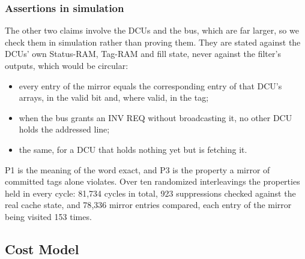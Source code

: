 \documentclass[conference]{IEEEtran}
\begin{document}
\subsubsection{Assertions in simulation}
The other two claims involve the DCUs and the bus, which are far larger, so we
check them in simulation rather than proving them. They are stated against the
DCUs' own Status-RAM, Tag-RAM and fill state, never against the filter's
outputs, which would be circular:
\begin{itemize}
  \item[P1] every entry of the mirror equals the corresponding entry of that
        DCU's arrays, in the valid bit and, where valid, in the tag;
  \item[P2] when the bus grants an INV REQ without broadcasting it, no other
        DCU holds the addressed line;
  \item[P3] the same, for a DCU that holds nothing yet but is fetching it.
\end{itemize}
P1 is the meaning of the word exact, and P3 is the property a mirror of
committed tags alone violates. Over ten randomized interleavings the
properties held in every cycle: 81{,}734 cycles in total, 923 suppressions
checked against the real cache state, and 78{,}336 mirror entries compared,
each entry of the mirror being visited 153 times.

\subsection{Cost Model}
\label{sec:model}
\end{document}
